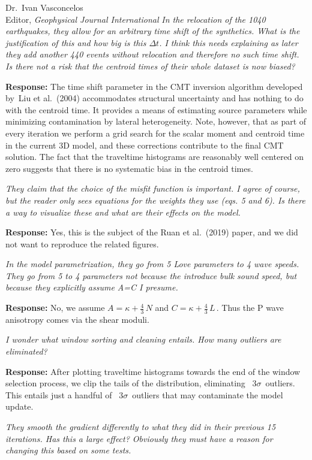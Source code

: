 \documentclass[11pt,a4paper]{letter}
\newcommand{\response}[1]{\textbf{Response:} #1}
\newcommand{\rev}[1]{{\it{#1}}}
\begin{document}
\begin{letter}{Dr.~Ivan Vasconcelos\\
Editor, \textit{Geophysical Journal International}}
\rev{In the relocation of the 1040 earthquakes, they allow for an arbitrary time shift of the synthetics. What is the justification of this and how big is this $\Delta t$.
I  think this needs explaining as later they add another 440 events without relocation and therefore no such time shift.
Is there not a risk that the centroid times of their whole dataset is now biased?
}

\response{The time shift parameter in the CMT inversion algorithm developed by~Liu et al.~(2004) accommodates structural uncertainty and has nothing to do with the centroid time.
It provides a means of estimating source parameters while minimizing contamination by lateral heterogeneity.
Note, however, that as part of every iteration we perform a grid search for the scalar moment and centroid time in the current 3D model,
and these corrections contribute to the final CMT solution.
The fact that the traveltime histograms are reasonably well centered
on zero suggests that there is no systematic bias in the centroid times.
}

\rev{They claim that the choice of the misfit function is important. I agree of course, but the reader only sees equations for the weights they use (eqs. 5 and 6). Is there a way to visualize these and what are their effects on the model.
}

\response{Yes, this is the subject of the Ruan et al.~(2019) paper, and we did not want to reproduce the related figures.}

\rev{In the model parametrization, they go from 5 Love parameters to 4 wave speeds. They   go from 5 to 4 parameters not because the introduce bulk sound speed, but because they explicitly assume A=C I presume.
}

\response{No, we assume $A=\kappa+\tfrac{4}{3}\,N$ and $C=\kappa+\tfrac{4}{3}\,L$\,. Thus the P wave anisotropy comes via the shear moduli.}

\rev{I wonder what window sorting and cleaning entails. How many outliers are eliminated?
}

\response{After plotting traveltime histograms towards the end of the window selection process, we clip the tails of the distribution, eliminating ~$3\sigma$~outliers.
This entails just a handful of ~$3\sigma$~outliers that may contaminate the model update.
}

\rev{They smooth the gradient differently to what they did in their previous 15 iterations. Has this a large effect? Obviously they must have a reason for changing this based on some tests.
}


\end{letter}
\end{document}
